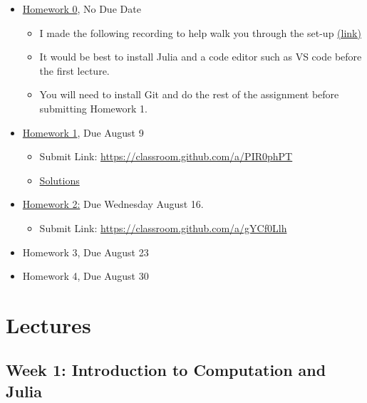 \documentclass[
]{book}
\providecommand{\tightlist}{%
  \setlength{\itemsep}{0pt}\setlength{\parskip}{0pt}}
\begin{document}
\begin{itemize}
\tightlist
\item
  \href{https://kevinghunt.github.io/ComputationCamp/homeworks/homework0.html}{Homework 0}, No Due Date

  \begin{itemize}
  \tightlist
  \item
    I made the following recording to help walk you through the set-up \href{https://uwmadison.zoom.us/rec/share/SbHWe_IMXFEaNy6ujwbKphJ2r3TgOvHtJqpkHT17NZDpX7cXcMdZhQtfmoC-WGNI.iN1B20YE_uH-QuFT?startTime=1690209565000}{(link)}
  \item
    It would be best to install Julia and a code editor such as VS code before the first lecture.
  \item
    You will need to install Git and do the rest of the assignment before submitting Homework 1.
  \end{itemize}
\item
  \href{https://kevinghunt.github.io/ComputationCamp/homeworks/homework1.html}{Homework 1}, Due August 9

  \begin{itemize}
  \tightlist
  \item
    Submit Link: \url{https://classroom.github.com/a/PIR0phPT}
  \item
    \href{https://kevinghunt.github.io/ComputationCamp/homework_solutions/Homework1_solutions.jl}{Solutions}
  \end{itemize}
\item
  \href{https://kevinghunt.github.io/ComputationCamp/homeworks/homework2.html}{Homework 2:} Due Wednesday August 16.

  \begin{itemize}
  \tightlist
  \item
    Submit Link: \url{https://classroom.github.com/a/gYCf0Llh}
  \end{itemize}
\item
  Homework 3, Due August 23
\item
  Homework 4, Due August 30
\end{itemize}

\hypertarget{lectures}{%
\chapter{Lectures}\label{lectures}}

\hypertarget{week-1-introduction-to-computation-and-julia-1}{%
\section{Week 1: Introduction to Computation and Julia}\label{week-1-introduction-to-computation-and-julia-1}}
\end{document}
